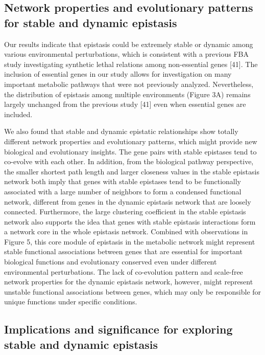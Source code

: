 \subsection{Network properties and evolutionary patterns for stable
and dynamic epistasis}

Our results indicate that epistasis could be extremely stable or
dynamic among various environmental perturbations, which is consistent
with a previous FBA study investigating synthetic lethal relations
among non-essential genes [41]. The inclusion of essential genes in
our study allows for investigation on many important metabolic
pathways that were not previously analyzed. Nevertheless, the
distribution of epistasis among multiple environments (Figure 3A)
remains largely unchanged from the previous study [41] even when
essential genes are included.

We also found that stable and dynamic epistatic relationships show
totally different network properties and evolutionary patterns, which
might provide new biological and evolutionary insights. The gene pairs
with stable epistases tend to co-evolve with each other. In addition,
from the biological pathway perspective, the smaller shortest path
length and larger closeness values in the stable epistasis network
both imply that genes with stable epistases tend to be functionally
associated with a large number of neighbors to form a condensed
functional network, different from genes in the dynamic epistasis
network that are loosely connected. Furthermore, the large clustering
coefficient in the stable epistasis network also supports the idea
that genes with stable epistasis interactions form a network core in
the whole epistasis network. Combined with observations in Figure 5,
this core module of epistasis in the metabolic network might represent
stable functional associations between genes that are essential for
important biological functions and evolutionary conserved even under
different environmental perturbations. The lack of co-evolution
pattern and scale-free network properties for the dynamic epistasis
network, however, might represent unstable functional associations
between genes, which may only be responsible for unique functions
under specific conditions.

\subsection{Implications and significance for exploring stable and
dynamic epistasis}

